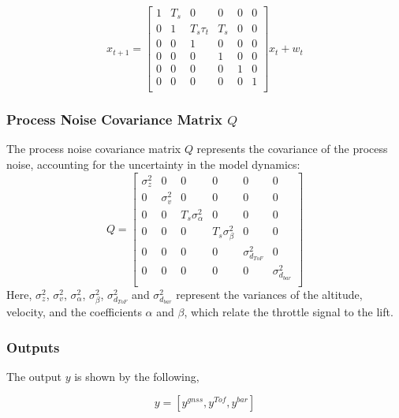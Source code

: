 \documentclass{report}
\begin{document}
    \begin{equation}
      x_{t+1} = 
      \begin{bmatrix}
        1 & T_s & 0 & 0 & 0 & 0\\
        0 & 1 & T_s \tau_t & T_s & 0 & 0\\
        0 & 0 & 1 & 0 & 0 & 0 \\
        0 & 0 & 0 & 1 & 0 & 0 \\
        0 & 0 & 0 & 0 & 1 & 0 \\
        0 & 0 & 0 & 0 & 0 & 1 \\
      \end{bmatrix}
      x_t + w_t
    \end{equation}

    \subsubsection*{Process Noise Covariance Matrix \( Q \)}
    The process noise covariance matrix \( Q \) represents the covariance of the
    process noise, accounting for the uncertainty in the model dynamics:
    \begin{equation}
    Q = 
    \begin{bmatrix}
    \sigma_z^2 & 0 & 0 & 0 & 0 & 0 \\
    0 & \sigma_v^2 & 0 & 0 & 0 & 0 \\
    0 & 0 & T_s \sigma_\alpha^2 & 0 & 0 & 0 \\
    0 & 0 & 0 & T_s \sigma_\beta^2 & 0 & 0 \\
    0 & 0 & 0 & 0 & \sigma^2_{d_{ToF}} & 0 \\
    0 & 0 & 0 & 0 & 0 & \sigma^2_{d_{bar}} \\
    \end{bmatrix}
    \end{equation}
    Here, \( \sigma_z^2 \), \( \sigma_v^2 \), \( \sigma_\alpha^2 \), \(
    \sigma_\beta^2 \), \( \sigma^2_{d_{ToF}} \) and \( \sigma^2_{d_{bar}} \)
    represent the variances of the altitude, velocity, and the coefficients \(
    \alpha \) and \( \beta \), which relate the throttle signal to the lift.

    \subsubsection*{Outputs}
    The output \(y\) is shown by the following,

    \begin{equation}
    y = [y^{gnss}, y^{Tof}, y^{bar}]
    \end{equation}
\end{document}
